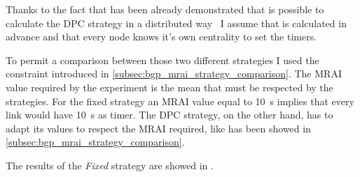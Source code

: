 Thanks to the fact that has been already demonstrated that is possible to calculate
the \ac{DPC} strategy in a distributed way~\cite{milani2019BGP} I
assume that is calculated in advance and that every node knows it's own centrality to
set the timers.

To permit a comparison between those two different strategies I used the
constraint introduced in \cref{subsec:bgp_mrai_strategy_comparison}.
The \ac{MRAI} value required by the experiment is the mean that must be respected
by the strategies.
For the fixed strategy an \ac{MRAI} value equal to \SI{10}{\second} implies that
every link would have \SI{10}{\second} as timer.
The \ac{DPC} strategy, on the other hand, has to adapt its values to respect the
\ac{MRAI} required, like has been showed in \cref{subsec:bgp_mrai_strategy_comparison}.

The results of the \textit{Fixed} strategy are showed in
.

